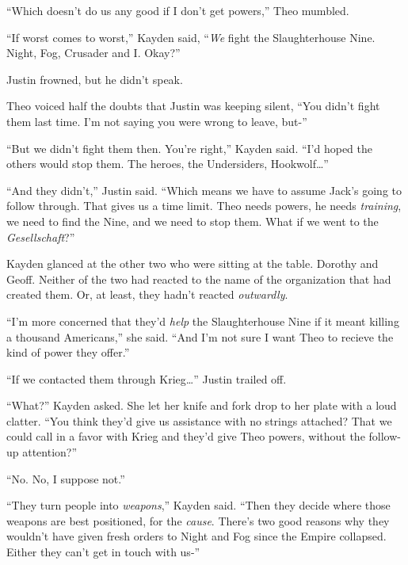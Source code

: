 ``Which doesn't do us any good if I don't get powers,'' Theo mumbled.



``If worst comes to worst,'' Kayden said, ``\emph{We} fight the Slaughterhouse Nine.  Night, Fog, Crusader and I.  Okay?''



Justin frowned, but he didn't speak.



Theo voiced half the doubts that Justin was keeping silent, ``You didn't fight them last time.  I'm not saying you were wrong to leave, but-''



``But we didn't fight them then.  You're right,'' Kayden said.  ``I'd hoped the others would stop them.  The heroes, the Undersiders, Hookwolf\ldots''



``And they didn't,'' Justin said.  ``Which means we have to assume Jack's going to follow through.  That gives us a time limit.  Theo needs powers, he needs \emph{training}, we need to find the Nine, and we need to stop them.  What if we went to the \emph{Gesellschaft}?''



Kayden glanced at the other two who were sitting at the table.  Dorothy and Geoff.  Neither of the two had reacted to the name of the organization that had created them.  Or, at least, they hadn't reacted \emph{outwardly}.



``I'm more concerned that they'd \emph{help} the Slaughterhouse Nine if it meant killing a thousand Americans,'' she said.  ``And I'm not sure I want Theo to recieve the kind of power they offer.''



``If we contacted them through Krieg\ldots''  Justin trailed off.



``What?'' Kayden asked.  She let her knife and fork drop to her plate with a loud clatter.  ``You think they'd give us assistance with no strings attached?  That we could call in a favor with Krieg and they'd give Theo powers, without the follow-up attention?''



``No.  No, I suppose not.''



``They turn people into\emph{ weapons},'' Kayden said.  ``Then they decide where those weapons are best positioned, for the \emph{cause}.  There's two good reasons why they wouldn't have given fresh orders to Night and Fog since the Empire collapsed.  Either they can't get in touch with us-''



